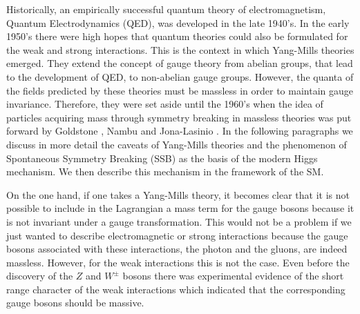 
Historically, an empirically successful quantum theory of electromagnetism, Quantum Electrodynamics (QED), was developed in the late 1940's. In the early 1950's there were high hopes that quantum theories could also be formulated for the weak and strong interactions. This is the context in which Yang-Mills theories emerged. They extend the concept of gauge theory from abelian groups, that lead to the development of QED, to non-abelian gauge groups. However, the quanta of the fields predicted by these theories must be massless in order to maintain gauge invariance. Therefore, they were set aside until the 1960's when the idea of particles acquiring mass through symmetry breaking in massless theories was put forward by Goldstone \cite{Goldstone}, Nambu and Jona-Lasinio \cite{Nambu-Jona-Lasinio}. In the following paragraphs we discuss in more detail the caveats of Yang-Mills theories and the phenomenon of Spontaneous Symmetry Breaking (SSB) as the basis of the modern Higgs mechanism. We then describe this mechanism in the framework of the SM.   

On the one hand, if one takes a Yang-Mills theory, it becomes clear that it is not possible to include in the Lagrangian a mass term for the gauge bosons because it is not invariant under a gauge transformation. This would not be a problem if we just wanted to describe electromagnetic or strong interactions because the gauge bosons associated with these interactions, the photon and the gluons, are indeed massless. However, for the weak interactions this is not the case. Even before the discovery of the $Z$ and $W^{\pm}$ bosons \cite{Zdiscovery,Wdiscovery} there was experimental evidence of the short range character of the weak interactions which indicated that the corresponding gauge bosons should be massive. 

